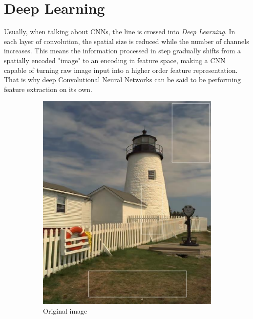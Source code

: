 \section{Deep Learning}
Usually, when talking about CNNs, the line is crossed into \textit{Deep Learning}. In each layer of convolution, the spatial size is reduced while the number of channels increases. This means the information processed in step gradually shifts from a spatially encoded "image" to an encoding in feature space, making a CNN capable of turning raw image input into a higher order feature representation. That is why deep Convolutional Neural Networks can be said to be performing feature extraction on its own.

\begin{figure}
    \begin{subfigure}[ht]{0.49\linewidth}
        \includegraphics[width=\linewidth]{Chapters/2.Background/figures/original.png}
        \caption{Original image}
    \end{subfigure}
    \hfill
    \begin{subfigure}[ht]{0.49\linewidth}

\end{subfigure}
\end{figure}
